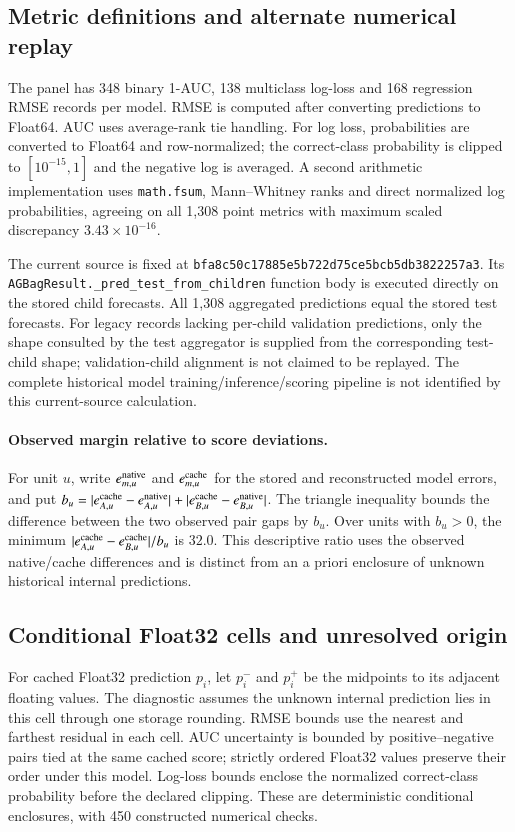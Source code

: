 

\subsection{Metric definitions and alternate numerical replay}
The panel has 348 binary 1-AUC, 138 multiclass log-loss and 168 regression RMSE records per model. RMSE is computed after converting predictions to Float64. AUC uses average-rank tie handling. For log loss, probabilities are converted to Float64 and row-normalized; the correct-class probability is clipped to $[10^{-15},1]$ and the negative log is averaged. A second arithmetic implementation uses \texttt{math.fsum}, Mann--Whitney ranks and direct normalized log probabilities, agreeing on all 1,308 point metrics with maximum scaled discrepancy $3.43\times10^{-16}$.

The current source is fixed at \nolinkurl{bfa8c50c17885e5b722d75ce5bcb5db3822257a3}. Its \nolinkurl{AGBagResult._pred_test_from_children} function body is executed directly on the stored child forecasts. All 1,308 aggregated predictions equal the stored test forecasts. For legacy records lacking per-child validation predictions, only the shape consulted by the test aggregator is supplied from the corresponding test-child shape; validation-child alignment is not claimed to be replayed. The complete historical model training/inference/scoring pipeline is not identified by this current-source calculation.

\paragraph{Observed margin relative to score deviations.}
For unit $u$, write $e_{m,u}^{\rm native}$ and $e_{m,u}^{\rm cache}$ for the stored and reconstructed model errors, and put $b_u=|e_{A,u}^{\rm cache}-e_{A,u}^{\rm native}|+|e_{B,u}^{\rm cache}-e_{B,u}^{\rm native}|$. The triangle inequality bounds the difference between the two observed pair gaps by $b_u$. Over units with $b_u>0$, the minimum $|e_{A,u}^{\rm cache}-e_{B,u}^{\rm cache}|/b_u$ is $32.0$. This descriptive ratio uses the observed native/cache differences and is distinct from an a priori enclosure of unknown historical internal predictions.

\subsection{Conditional Float32 cells and unresolved origin}
For cached Float32 prediction $p_i$, let $p_i^-$ and $p_i^+$ be the midpoints to its adjacent floating values. The diagnostic assumes the unknown internal prediction lies in this cell through one storage rounding. RMSE bounds use the nearest and farthest residual in each cell. AUC uncertainty is bounded by positive--negative pairs tied at the same cached score; strictly ordered Float32 values preserve their order under this model. Log-loss bounds enclose the normalized correct-class probability before the declared clipping. These are deterministic conditional enclosures, with 450 constructed numerical checks.

